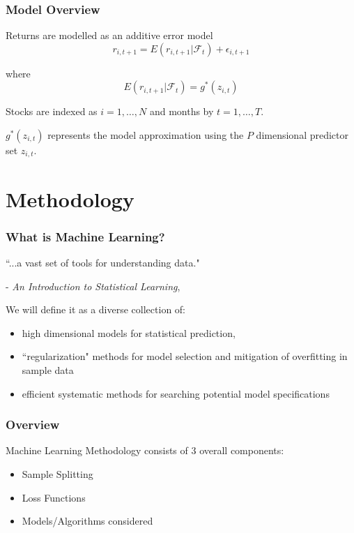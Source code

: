 \documentclass[]{beamer}
\begin{document}
\begin{frame}
\frametitle{Model Overview}
Returns are modelled as an additive error model
\begin{equation}
	r_{i, t+1} = E(r_{i, t+1} | \mathcal{F}_t) + \epsilon_{i, t+1}
\end{equation}
		
where 
\begin{equation}
	E(r_{i, t+1} | \mathcal{F}_t) = g^*(z_{i,t})
\end{equation}
		
Stocks are indexed as $i = 1, \dots, N$ and months by $t = 1, \dots, T$. 

$g^*(z_{i,t})$ represents the model approximation using the $P$ dimensional predictor set $z_{i,t}$. 
\end{frame}

\section{Methodology}

\begin{frame}
	\frametitle{What is Machine Learning?}
	``...a vast set of tools for understanding data."
	
	- \textit{An Introduction to Statistical Learning}, \citep{hastie_elements_2009}
	
	We will define it as a diverse collection of:
	\begin{itemize}
		\item high dimensional models for statistical prediction,
		\item ``regularization" methods for model selection and mitigation of overfitting in sample data
		\item efficient systematic methods for searching potential model specifications
	\end{itemize}
\end{frame}

\begin{frame}
\frametitle{Overview}
Machine Learning Methodology consists of 3 overall components:
\begin{itemize}
	\item Sample Splitting
	\item Loss Functions
	\item Models/Algorithms considered
\end{itemize}
\end{frame}
\end{document}
